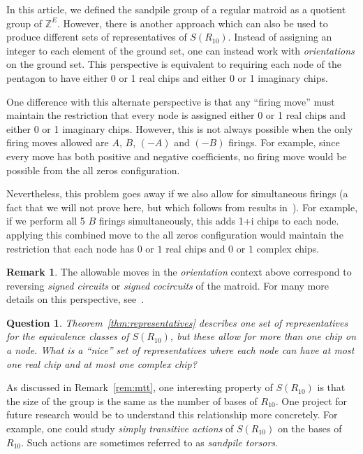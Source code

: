 \documentclass[12p]{amsart}
\numberwithin{equation}{section}
\theoremstyle{plain}
\newtheorem{open}[thm]{Question}
\theoremstyle{definition}
\newtheorem{remark}[thm]{Remark}
\newcommand{\Z}{\mathbb {Z}}
\begin{document}
In this article, we defined the sandpile group of a regular matroid as a quotient group of $\Z^E$. However, there is another approach which can also be used to produce different sets of representatives of $S(R_{10})$. Instead of assigning an integer to each element of the ground set, one can instead work with \emph{orientations} on the ground set. This perspective is equivalent to requiring each node of the pentagon to have either 0 or 1 real chips and either 0 or 1 imaginary chips. 

One difference with this alternate perspective is that any ``firing move'' must maintain the restriction that every node is assigned either 0 or 1 real chips and either 0 or 1 imaginary chips. However, this is not always possible when the only firing moves allowed are $A$, $B$, $(-A)$ and $(-B)$ firings. For example, since every move has both positive and negative coefficients, no firing move would be possible from the all zeros configuration. 

Nevertheless, this problem goes away if we also allow for simultaneous firings (a fact that we will not prove here, but which follows from results in~\cite{BBY}). For example, if we perform all 5 $B$ firings simultaneously, this adds 1+i chips to each node. applying this combined move to the all zeros configuration would maintain the restriction that each node has $0$ or $1$ real chips and $0$ or $1$ complex chips.

\begin{remark}The allowable moves in the \emph{orientation} context above correspond to reversing \emph{signed circuits} or \emph{signed cocircuits} of the matroid. For many more details on this perspective, see~\cite{Gioan}. \end{remark}

\begin{open}
    Theorem~\ref{thm:representatives} describes one set of representatives for the equivalence classes of $S(R_{10})$, but these allow for more than one chip on a node. What is a ``nice'' set of representatives where each node can have at most one real chip and at most one complex chip? 
\end{open}

As discussed in Remark~\ref{rem:mtt}, one interesting property of $S(R_{10})$ is that the size of the group is the same as the number of bases of $R_{10}$. One project for future research would be to understand this relationship more concretely. For example, one could study \emph{simply transitive actions} of $S(R_{10})$ on the bases of $R_{10}$. Such actions are sometimes referred to as \emph{sandpile torsors}. 
\end{document}
